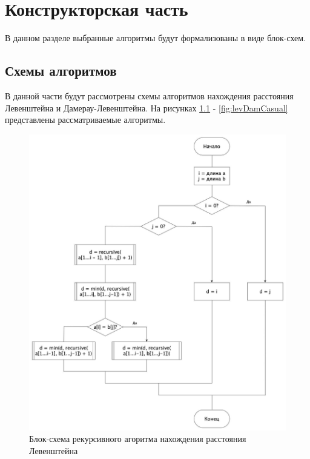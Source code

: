 \documentclass[12pt]{report}
\begin{document}
    \chapter{Конструкторская часть}

    В данном разделе выбранные алгоритмы будут формализованы в виде блок-схем.

    \section{Схемы алгоритмов}
    В данной части будут рассмотрены схемы алгоритмов нахождения расстояния Левенштейна и Дамерау-Левенштейна.
    На рисунках \ref{fig:levRecur} - \ref{fig:levDamCasual} представлены рассматриваемые алгоритмы.

    \begin{figure}[H]
        \centering
        \includegraphics[width=0.7\linewidth]{img/levRecur}
        \caption{Блок-схема рекурсивного агоритма нахождения расстояния Левенштейна}
        \label{fig:levRecur}
    \end{figure}
\end{document}
